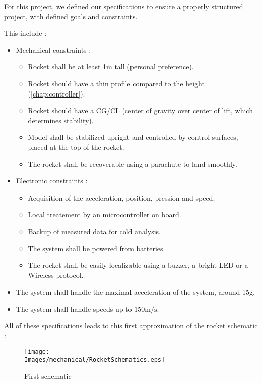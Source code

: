 For this project, we defined our specifications to ensure a properly structured
project, with defined goals and constraints.

This include :

\begin{itemize}
    \item Mechanical constraints :
          \begin{itemize}[noitemsep]
              \item Rocket shall be at least 1m tall (personal preference).
              \item Rocket should have a thin profile compared to the height
                    (\ref{chap:controller}).
              \item Rocket should have a CG/CL (center of gravity over center of lift, which
                    determines stability).
              \item Model shall be stabilized upright and controlled by control surfaces, placed at
                    the top of the rocket.
              \item The rocket shall be recoverable using a parachute to land smoothly.
          \end{itemize}

    \item Electronic constraints :
          \begin{itemize}[noitemsep]
              \item Acquisition of the acceleration, position, pression and speed.
              \item Local treatement by an microcontroller on board.
              \item Backup of measured data for cold analysis.
              \item The system shall be powered from batteries.
              \item The rocket shall be easily localizable using a buzzer, a bright LED or a
                    Wireless protocol.
          \end{itemize}

    \item   The system shall handle the maximal acceleration of the system, around 15g.
    \item   The system shall handle speeds up to $150 \si{\meter\per\second}$.
\end{itemize}

\vspace{0.8 cm}

All of these specifications leads to this first approximation of the rocket
schematic :

\begin{figure}[!hbt]
    \centering
    \texttt{[image: \\Images/mechanical/RocketSchematics.eps]}
    \caption{First schematic}
\end{figure}
\FloatBarrier

